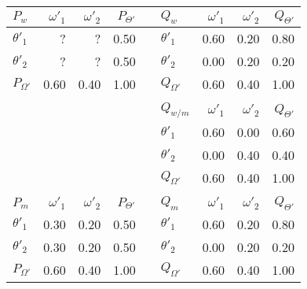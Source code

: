 \documentclass[11pt]{article}
\begin{document}
\begin{tabular}{|l|r|r|r|c|l|r|r|r|}\hline
$P_{w}$ & $\omega'_{1}$ & $\omega'_{2}$ & $P_{\Theta'}$ & \cellcolor[gray]{0.9} & $Q_{w}$ & $\omega'_{1}$ & $\omega'_{2}$ & $Q_{\Theta'}$ \\ \hline
$\theta'_{1}$ & ? & ? & 0.50 & \cellcolor[gray]{0.9} & $\theta'_{1}$ & 0.60 & 0.20 & 0.80 \\ \hline
$\theta'_{2}$ & ? & ? & 0.50 & \cellcolor[gray]{0.9} & $\theta'_{2}$ & 0.00 & 0.20 & 0.20 \\ \hline
$P_{\Omega'}$ & 0.60 & 0.40 & 1.00 & \cellcolor[gray]{0.9} & $Q_{\Omega'}$ & 0.60 & 0.40 & 1.00\\ \hline
\cellcolor[gray]{0.9} & \cellcolor[gray]{0.9} & \cellcolor[gray]{0.9} & \cellcolor[gray]{0.9} & \cellcolor[gray]{0.9} & \cellcolor[gray]{0.9} & \cellcolor[gray]{0.9} & \cellcolor[gray]{0.9} & \cellcolor[gray]{0.9} \\ \hline
\cellcolor[gray]{0.9} & \cellcolor[gray]{0.9} & \cellcolor[gray]{0.9} & \cellcolor[gray]{0.9} & \cellcolor[gray]{0.9} & $Q_{w/m}$ & $\omega'_{1}$ & $\omega'_{2}$ & $Q_{\Theta'}$ \\ \hline
\cellcolor[gray]{0.9} & \cellcolor[gray]{0.9} & \cellcolor[gray]{0.9} & \cellcolor[gray]{0.9} & \cellcolor[gray]{0.9} & $\theta'_{1}$ & 0.60 & 0.00 & 0.60 \\ \hline
\cellcolor[gray]{0.9} & \cellcolor[gray]{0.9} & \cellcolor[gray]{0.9} & \cellcolor[gray]{0.9} & \cellcolor[gray]{0.9} & $\theta'_{2}$ & 0.00 & 0.40 & 0.40 \\ \hline
\cellcolor[gray]{0.9} & \cellcolor[gray]{0.9} & \cellcolor[gray]{0.9} & \cellcolor[gray]{0.9} & \cellcolor[gray]{0.9} & $Q_{\Omega'}$ & 0.60 & 0.40 & 1.00\\ \hline
\cellcolor[gray]{0.9} & \cellcolor[gray]{0.9} & \cellcolor[gray]{0.9} & \cellcolor[gray]{0.9} & \cellcolor[gray]{0.9} & \cellcolor[gray]{0.9} & \cellcolor[gray]{0.9} & \cellcolor[gray]{0.9} & \cellcolor[gray]{0.9} \\ \hline
$P_{m}$ & $\omega'_{1}$ & $\omega'_{2}$ & $P_{\Theta'}$ & \cellcolor[gray]{0.9} & $Q_{m}$ & $\omega'_{1}$ & $\omega'_{2}$ & $Q_{\Theta'}$ \\ \hline
$\theta'_{1}$ & 0.30 & 0.20 & 0.50 & \cellcolor[gray]{0.9} & $\theta'_{1}$ & 0.60 & 0.20 & 0.80 \\ \hline
$\theta'_{2}$ & 0.30 & 0.20 & 0.50 & \cellcolor[gray]{0.9} & $\theta'_{2}$ & 0.00 & 0.20 & 0.20 \\ \hline
$P_{\Omega'}$ & 0.60 & 0.40 & 1.00& \cellcolor[gray]{0.9} & $Q_{\Omega'}$ & 0.60 & 0.40 & 1.00\\ \hline
\end{tabular}
\end{document}
